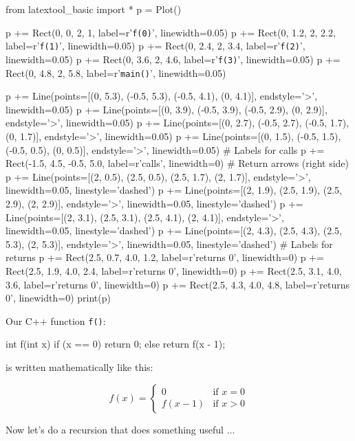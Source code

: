 \begin{python}
from latextool_basic import *
p = Plot()

p += Rect(0, 0, 2, 1, label=r'\texttt{f(0)}', linewidth=0.05)
p += Rect(0, 1.2, 2, 2.2, label=r'\texttt{f(1)}', linewidth=0.05)
p += Rect(0, 2.4, 2, 3.4, label=r'\texttt{f(2)}', linewidth=0.05)
p += Rect(0, 3.6, 2, 4.6, label=r'\texttt{f(3)}', linewidth=0.05)
p += Rect(0, 4.8, 2, 5.8, label=r'\texttt{main()}', linewidth=0.05)

p += Line(points=[(0, 5.3), (-0.5, 5.3), (-0.5, 4.1), (0, 4.1)], endstyle='>', linewidth=0.05)
p += Line(points=[(0, 3.9), (-0.5, 3.9), (-0.5, 2.9), (0, 2.9)], endstyle='>', linewidth=0.05)
p += Line(points=[(0, 2.7), (-0.5, 2.7), (-0.5, 1.7), (0, 1.7)], endstyle='>', linewidth=0.05)
p += Line(points=[(0, 1.5), (-0.5, 1.5), (-0.5, 0.5), (0, 0.5)], endstyle='>', linewidth=0.05)
# Labels for calls
p += Rect(-1.5, 4.5, -0.5, 5.0, label=r'\small{calls}', linewidth=0)
# Return arrows (right side)
p += Line(points=[(2, 0.5), (2.5, 0.5), (2.5, 1.7), (2, 1.7)], endstyle='>', linewidth=0.05, linestyle='dashed')
p += Line(points=[(2, 1.9), (2.5, 1.9), (2.5, 2.9), (2, 2.9)], endstyle='>', linewidth=0.05, linestyle='dashed')
p += Line(points=[(2, 3.1), (2.5, 3.1), (2.5, 4.1), (2, 4.1)], endstyle='>', linewidth=0.05, linestyle='dashed')
p += Line(points=[(2, 4.3), (2.5, 4.3), (2.5, 5.3), (2, 5.3)], endstyle='>', linewidth=0.05, linestyle='dashed')
# Labels for returns
p += Rect(2.5, 0.7, 4.0, 1.2, label=r'\small{returns 0}', linewidth=0)
p += Rect(2.5, 1.9, 4.0, 2.4, label=r'\small{returns 0}', linewidth=0)
p += Rect(2.5, 3.1, 4.0, 3.6, label=r'\small{returns 0}', linewidth=0)
p += Rect(2.5, 4.3, 4.0, 4.8, label=r'\small{returns 0}', linewidth=0)
print(p)
\end{python}

Our C++ function \texttt{f()}:

\begin{consolethree}[escapeinside=||]
int f(int x)
{
    if (x == 0)
    {
        return 0;
    }
    else
    {
        return f(x - 1);
    }
}
\end{consolethree}

is written mathematically like this:

\[
f(x) = \begin{cases}
0 & \text{if } x = 0 \\
f(x - 1) & \text{if } x > 0
\end{cases}
\]

Now let's do a recursion that does something useful ...


